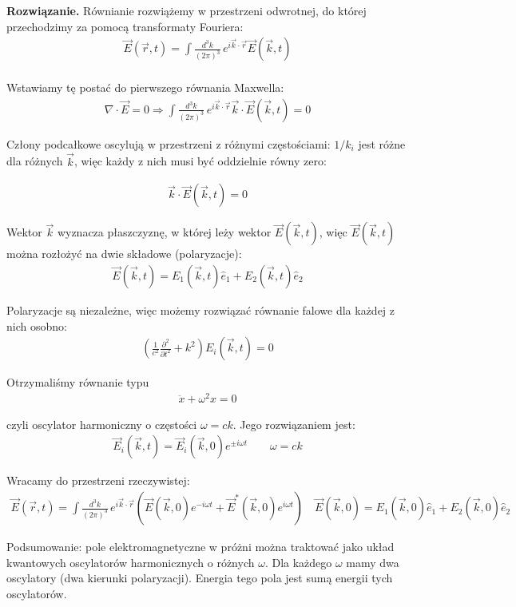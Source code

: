 \documentclass[11pt,a4paper]{article}
\newenvironment{solution}{\vspace{1cm} \par\textbf{Rozwiązanie.} \vspace{1cm}}{}
\begin{document}
\begin{solution}
Równianie rozwiążemy w przestrzeni odwrotnej, do której przechodzimy 
za pomocą transformaty Fouriera:
\begin{align*}
\vec{E}(\vec{r},t) = \int \frac{d^3 k}{(2\pi)^3} \, e^{i\vec{k} \cdot \vec{r} } \vec{E}(\vec{k},t) \\
\end{align*}

Wstawiamy tę postać do pierwszego równania Maxwella:
\begin{align*}
\nabla \cdot \vec{E} = 0 \Rightarrow
\int \frac{d^3 k}{(2\pi)^3} \,e^{i\vec{k} \cdot \vec{r} } \vec{k} \cdot \vec{E}(\vec{k},t) = 0
\end{align*}

Człony podcałkowe oscylują w przestrzeni z różnymi częstościami: 
$1/k_{i}$ jest różne dla różnych $\vec{k}$, więc każdy z nich musi być 
oddzielnie równy zero:

\begin{align*}
\vec{k} \cdot \vec{E}(\vec{k},t) = 0
\end{align*}

Wektor $\vec{k}$ wyznacza płaszczyznę, w której leży wektor $\vec{E}(\vec{k},t)$, 
więc $\vec{E}(\vec{k},t)$ można rozłożyć na dwie składowe (polaryzacje):
\begin{align*}
\vec{E}(\vec{k},t) = E_1(\vec{k},t) \hat{e}_1 + E_2(\vec{k},t) \hat{e}_2
\end{align*}
  
Polaryzacje są niezależne, więc możemy rozwiązać równanie falowe dla 
każdej z nich osobno:
\begin{align*}
\left(\frac{1}{c^2} \frac{\partial^2}{\partial t^2} + k^2\right) E_i(\vec{k},t) = 0
\end{align*}

Otrzymaliśmy równanie typu
\begin{align*}
  \ddot{x} + \omega^2 x = 0
\end{align*}

czyli oscylator harmoniczny o częstości $\omega = ck$.
Jego rozwiązaniem jest:
\begin{align*}
\vec{E}_{i}(\vec{k},t) = \vec{E}_{i}(\vec{k}, 0) e^{\pm i\omega t} \qquad 
\omega = ck
\end{align*}

Wracamy do przestrzeni rzeczywistej:
\begin{align*}
\vec{E}(\vec{r},t) = 
\int \frac{d^3 k}{(2\pi)^3} \, e^{i\vec{k} \cdot \vec{r} } 
\left( \vec{E}(\vec{k}, 0) e^{-i\omega t} + 
\vec{E}^{*}(\vec{k}, 0) e^{i\omega t} \right) \quad \vec{E}(\vec{k}, 0) = E_1(\vec{k}, 0) \hat{e}_1 + E_2(\vec{k}, 0) \hat{e}_2
\end{align*}

Podsumowanie: pole elektromagnetyczne w próżni można traktować jako
układ kwantowych oscylatorów harmonicznych o różnych $\omega$. Dla każdego 
$\omega$ mamy dwa oscylatory (dwa kierunki polaryzacji).
Energia tego pola jest sumą energii tych oscylatorów.

\newpage
\end{solution}
\end{document}
